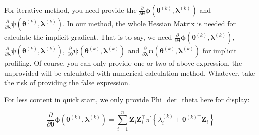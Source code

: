 \documentclass[
]{article}
\begin{document}
For iterative method, you need provide the
\(\frac{\partial}{\partial \boldsymbol{\theta}} \boldsymbol{\phi}\left(\boldsymbol{\theta}^{(k)}, \boldsymbol{\lambda}^{(k)}\right)\)
and
\(\frac{\partial}{\partial \boldsymbol{\lambda}} \boldsymbol{\psi}\left(\boldsymbol{\theta}^{(k)}, \boldsymbol{\lambda}^{(k)}\right)\).
In our method, the whole Hessian Matrix is needed for calculate the
implicit gradient. That is to say, we need
\(\frac{\partial}{\partial \boldsymbol{\theta}} \boldsymbol{\phi}\left(\boldsymbol{\theta}^{(k)}, \boldsymbol{\lambda}^{(k)}\right)\),
\(\frac{\partial}{\partial \boldsymbol{\lambda}} \boldsymbol{\psi}\left(\boldsymbol{\theta}^{(k)}, \boldsymbol{\lambda}^{(k)}\right)\),
\(\frac{\partial}{\partial \boldsymbol{\theta}} \boldsymbol{\psi}\left(\boldsymbol{\theta}^{(k)}, \boldsymbol{\lambda}^{(k)}\right)\)
and
\(\frac{\partial}{\partial \boldsymbol{\lambda}} \boldsymbol{\phi}\left(\boldsymbol{\theta}^{(k)}, \boldsymbol{\lambda}^{(k)}\right)\)
for implicit profiling. Of course, you can only provide one or two of
above expression, the unprovided will be calculated with numerical
calculation method. Whatever, take the risk of providing the false
expression.

For less content in quick start, we only provide Phi\_der\_theta here
for display:

\[
\frac{\partial}{\partial \boldsymbol{\theta}} \boldsymbol{\phi}\left(\boldsymbol{\theta}^{(k)}, \boldsymbol{\lambda}^{(k)}\right) = \sum_{i=1}^{n} \mathbf{Z}_{i} \mathbf{Z}_{i}^{\top} \pi^{\prime}\left\{\lambda_{i}^{(k)}+\boldsymbol{\theta}^{(k) \top} \mathbf{Z}_{i}\right\}
\]
\end{document}
